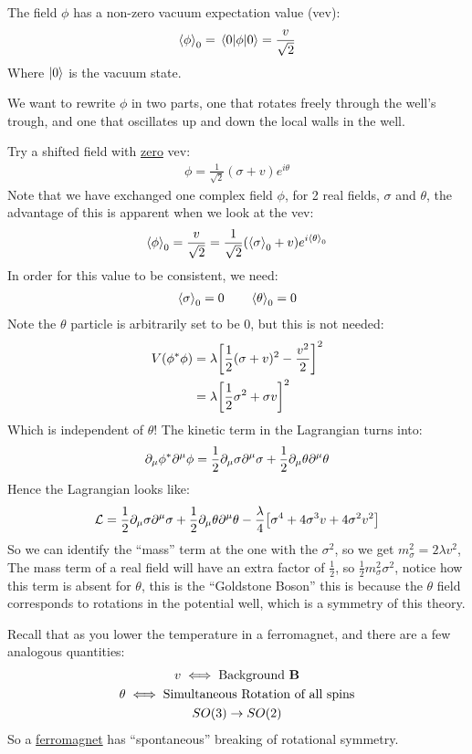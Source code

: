 The field $\phi$ has a non-zero vacuum expectation value (vev):
\begin{align*}
  \ev{\phi}_0=\mel{0}{\phi}{0}=\frac{v}{\sqrt{2}}
\end{align*}
Where $\ket{0}$ is the vacuum state.

We want to rewrite $\phi$ in two parts, one that rotates freely through the well's trough, and one that oscillates up and down the local walls in the well.

Try a shifted field with \underline{zero} vev:
\begin{align*}
  \phi=\frac1{\sqrt{2}}(\sigma+v)e^{i\theta}
\end{align*}
Note that we have exchanged one complex field $\phi$, for 2 real fields, $\sigma$ and $\theta$, the advantage of this is apparent when we look at the vev:
\begin{align*}
  \ev{\phi}_0=\frac{v}{\sqrt{2}}=\frac1{\sqrt{2}}(\ev{\sigma}_0+v)
  e^{i\ev{\theta}_0}
\end{align*}
In order for this value to be consistent, we need:
\begin{align*}
  \ev{\sigma}_0=0\qquad \ev{\theta}_0=0
\end{align*}
Note the $\theta$ particle is arbitrarily set to be $0$, but this is not needed:
\begin{align*}
  V(\phi^*\phi)&=\lambda\qty[\frac12(\sigma+v)^2-\frac{v^2}2]^2\\
  &=\lambda\qty[\frac12\sigma^2+\sigma v]^2
\end{align*}
Which is independent of $\theta$! The kinetic term in the Lagrangian turns into:
\begin{align*}
  \partial_\mu\phi^*\partial^\mu\phi=\frac12\partial_\mu\sigma\partial^\mu\sigma
  +\frac12\partial_\mu\theta\partial^\mu\theta
\end{align*}
Hence the Lagrangian looks like:
\begin{align*}
  \mathcal{L}=\frac12\partial_\mu\sigma\partial^\mu\sigma+\frac12\partial_\mu\theta\partial^\mu\theta
  -\frac\lambda4\qty[\sigma^4+4\sigma^3v+4\sigma^2v^2]
\end{align*}
So we can identify the ``mass'' term at the one with the $\sigma^2$, so we get $m_\sigma^2=2\lambda v^2$, The mass term of a real field will have an extra factor of $\frac12$, so $\frac12m_{\sigma}^2\sigma^2$, notice how this term is absent for $\theta$, this is the ``Goldstone Boson'' this is because the $\theta$ field corresponds to rotations in the potential well, which is a symmetry of this theory.
\begin{aside}
  Recall that as you lower the temperature in a ferromagnet, and there are a few analogous quantities:
  \begin{gather*}
    v \iff \text{Background } \vb{B}\\
    \theta \iff \text{Simultaneous Rotation of all spins}\\
    SO(3) \to SO(2)
  \end{gather*}
  So a \underline{ferromagnet} has ``spontaneous'' breaking of rotational symmetry. 
\end{aside}


